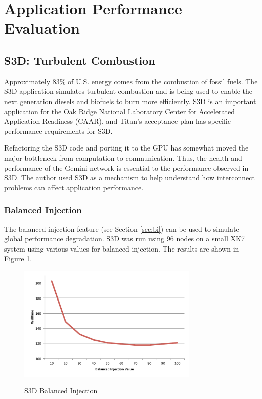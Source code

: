 \documentclass[10pt, conference, compsocconf]{IEEEtran}
\begin{document}



\section{Application Performance Evaluation}

\subsection{S3D: Turbulent Combustion}

Approximately 83\% of U.S. energy comes from the combustion of fossil fuels.
The S3D application simulates turbulent combustion and is being used to enable
the next generation diesels and biofuels to burn more efficiently.  S3D is an
important application for the Oak Ridge National Laboratory Center for
Accelerated Application Readiness (CAAR), and Titan's acceptance plan has
specific performance requirements for S3D. 

Refactoring the S3D code and porting it to the GPU has somewhat moved the major
bottleneck from computation to communication.  Thus, the health and performance
of the Gemini network is essential to the performance observed in S3D.  The
author used S3D as a mechanism to help understand how interconnect problems can
affect application performance.

\subsubsection{Balanced Injection}

The balanced injection feature (see Section \ref{sec:bi}) can be used to
simulate global performance degradation.  S3D was run using 96 nodes on a small
XK7 system using various values for balanced injection.  The results are shown
in Figure \ref{fig:s3dbi}.

\begin{figure}[h]
  \centering
  \includegraphics[width=3.4in]{figures/s3d_bisweep.pdf}\\
  \caption{S3D Balanced Injection}\label{fig:s3dbi}
\end{figure}
\end{document}

